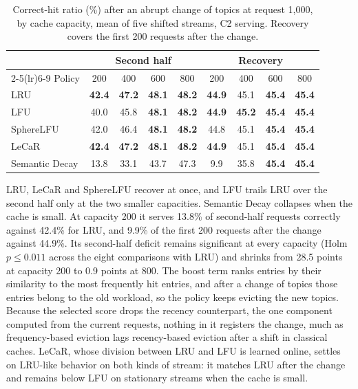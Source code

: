 \documentclass[authoryear,preprint,review,12pt]{elsarticle}
\begin{document}
\begin{table}[htbp]
\centering
\caption{Correct-hit ratio (\%) after an abrupt change of topics at request 1,000, by cache capacity, mean of five shifted streams, C2 serving. Recovery covers the first 200 requests after the change.}
\label{tab:eviction_shift}
\footnotesize
\setlength{\tabcolsep}{4pt}
\begin{tabular}{lcccccccc}
\toprule
 & \multicolumn{4}{c}{Second half} & \multicolumn{4}{c}{Recovery} \\
\cmidrule(lr){2-5}\cmidrule(lr){6-9}
Policy & 200 & 400 & 600 & 800 & 200 & 400 & 600 & 800 \\
\midrule
LRU & \textbf{42.4} & \textbf{47.2} & \textbf{48.1} & \textbf{48.2} & \textbf{44.9} & 45.1 & \textbf{45.4} & \textbf{45.4} \\
LFU & 40.0 & 45.8 & \textbf{48.1} & \textbf{48.2} & \textbf{44.9} & \textbf{45.2} & \textbf{45.4} & \textbf{45.4} \\
SphereLFU & 42.0 & 46.4 & \textbf{48.1} & \textbf{48.2} & 44.8 & 45.1 & \textbf{45.4} & \textbf{45.4} \\
LeCaR & \textbf{42.4} & \textbf{47.2} & \textbf{48.1} & \textbf{48.2} & \textbf{44.9} & 45.1 & \textbf{45.4} & \textbf{45.4} \\
Semantic Decay & 13.8 & 33.1 & 43.7 & 47.3 & 9.9 & 35.8 & \textbf{45.4} & \textbf{45.4} \\
\bottomrule
\end{tabular}
\end{table}

LRU, LeCaR and SphereLFU recover at once, and LFU trails LRU over the second half only at the two smaller capacities. Semantic Decay collapses when the cache is small. At capacity 200 it serves 13.8\% of second-half requests correctly against 42.4\% for LRU, and 9.9\% of the first 200 requests after the change against 44.9\%. Its second-half deficit remains significant at every capacity (Holm $p\le0.011$ across the eight comparisons with LRU) and shrinks from 28.5 points at capacity 200 to 0.9 points at 800. The boost term ranks entries by their similarity to the most frequently hit entries, and after a change of topics those entries belong to the old workload, so the policy keeps evicting the new topics. Because the selected score drops the recency counterpart, the one component computed from the current requests, nothing in it registers the change, much as frequency-based eviction lags recency-based eviction after a shift in classical caches. LeCaR, whose division between LRU and LFU is learned online, settles on LRU-like behavior on both kinds of stream: it matches LRU after the change and remains below LFU on stationary streams when the cache is small.
\end{document}
